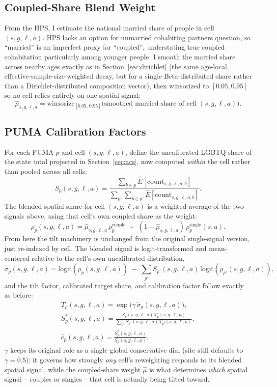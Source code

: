 \documentclass[11pt]{article}
\begin{document}
\subsection{Coupled-Share Blend Weight}

From the HPS, I estimate the national married share of people in cell $(s,g,\ell,a)$.
HPS lacks an option for unmarried cohabiting partners question, so ``married'' is an imperfect proxy for ``coupled'', understating true coupled cohabitation particularly among younger people. I smooth the married share across nearby ages exactly as in Section~\ref{sec:dirichlet} (the same age-local, effective-sample-size-weighted decay, but for a single Beta-distributed share rather than a Dirichlet-distributed composition vector), then winsorized to $[0.05,
0.95]$ so no cell relies entirely on one spatial signal:
\[
\hat\mu_{s,g,\ell,a} = \text{winsorize}_{[0.05,\,0.95]}\big(\text{smoothed
married share of cell } (s,g,\ell,a)\big).
\]

\subsection{PUMA Calibration Factors}

For each PUMA $p$ and cell $(s,g,\ell,a)$, define the uncalibrated LGBTQ
share of the state total projected in Section~\ref{sec:acs}, now computed
\emph{within} the cell rather than pooled across all cells:
\[
S_p(s,g,\ell,a) = \frac{\sum_{b \in p} \hat{E}[\text{count}_{s,g,\ell,a,b}]}
{\sum_{p'} \sum_{b \in p'} \hat{E}[\text{count}_{s,g,\ell,a,b}]}.
\]
The blended spatial share for cell $(s,g,\ell,a)$ is a weighted average of
the two signals above, using that cell's own coupled share as the weight:
\[
\rho_p(s,g,\ell,a) = \hat\mu_{s,g,\ell,a}\, \rho_p^{\text{couple}}
\;+\; (1-\hat\mu_{s,g,\ell,a})\, \rho_p^{\text{single}}(s,a).
\]
From here the tilt machinery is unchanged from the original single-signal
version, just re-indexed by cell. The blended signal is logit-transformed
and mean-centered relative to the cell's own uncalibrated distribution,
\[
\tilde{\sigma}_p(s,g,\ell,a)
=
\text{logit}(\rho_p(s,g,\ell,a))
\;-\;
\sum_{p'} S_{p'}(s,g,\ell,a)\,\text{logit}(\rho_{p'}(s,g,\ell,a)),
\]
and the tilt factor, calibrated target share, and calibration factor follow
exactly as before:
\begin{gather*}
T_p(s,g,\ell,a) = \exp\!\big(\gamma\, \tilde{\sigma}_p(s,g,\ell,a)\big),
\\[4pt]
S_p^*(s,g,\ell,a) = \frac{S_p(s,g,\ell,a)\, T_p(s,g,\ell,a)}
{\sum_{p'} S_{p'}(s,g,\ell,a)\, T_{p'}(s,g,\ell,a)},
\\[4pt]
\hat{c}_p(s,g,\ell,a) = \frac{S_p^*(s,g,\ell,a)}{S_p(s,g,\ell,a)}.
\end{gather*}
$\gamma$ keeps its original role as a single global conservative dial (site
still defaults to $\gamma=0.5$): it governs how strongly \emph{any} cell's
reweighting responds to its blended spatial signal, while the coupled-share
weight $\hat\mu$ is what determines \emph{which} spatial signal -- couples
or singles -- that cell is actually being tilted toward.
\end{document}
